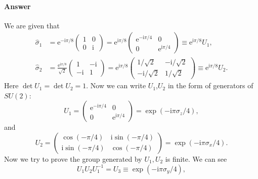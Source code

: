 \paragraph{Answer}
We are given that
\begin{equation*}
\begin{aligned}
\hat{\sigma }_{1} & =\mathrm{e}^{-\mathrm{i} \pi /8}\begin{pmatrix}
1 & 0\\
0 & \mathrm{i}
\end{pmatrix} =\mathrm{e}^{\mathrm{i} \pi /8}\begin{pmatrix}
\mathrm{e}^{-\mathrm{i} \pi /4} & 0\\
0 & \mathrm{e}^{\mathrm{i} \pi /4}
\end{pmatrix} \equiv \mathrm{e}^{\mathrm{i} \pi /8} U_{1} ,\\
\hat{\sigma }_{2} & =\frac{\mathrm{e}^{\mathrm{i} \pi /8}}{\sqrt{2}}\begin{pmatrix}
1 & -\mathrm{i}\\
-\mathrm{i} & 1
\end{pmatrix} =\mathrm{e}^{\mathrm{i} \pi /8}\begin{pmatrix}
1/\sqrt{2} & -\mathrm{i} /\sqrt{2}\\
-\mathrm{i} /\sqrt{2} & 1/\sqrt{2}
\end{pmatrix} \equiv \mathrm{e}^{\mathrm{i} \pi /8} U_{2} .
\end{aligned}
\end{equation*}
Here $\det U_{1} =\det U_{2} =1$. Now we can write $U_{1}$,$U_{2}$ in the form of generators of $SU( 2)$:
\begin{equation*}
U_{1} =\begin{pmatrix}
\mathrm{e}^{-\mathrm{i} \pi /4} & 0\\
0 & \mathrm{e}^{\mathrm{i} \pi /4}
\end{pmatrix} =\exp( -\mathrm{i} \pi \sigma _{z} /4) ,
\end{equation*}
and
\begin{equation*}
U_{2} =\begin{pmatrix}
\cos( -\pi /4) & \mathrm{i}\sin( -\pi /4)\\
\mathrm{i}\sin( -\pi /4) & \cos( -\pi /4)
\end{pmatrix} =\exp( -\mathrm{i} \pi \sigma _{x} /4) .
\end{equation*}
Now we try to prove the group generated by $U_{1} ,U_{2}$ is finite. We can see
\begin{equation*}
U_{1} U_{2} U_{1}^{-1} =U_{3} \equiv \exp( -\mathrm{i} \pi \sigma _{y} /4) ,
\end{equation*}
